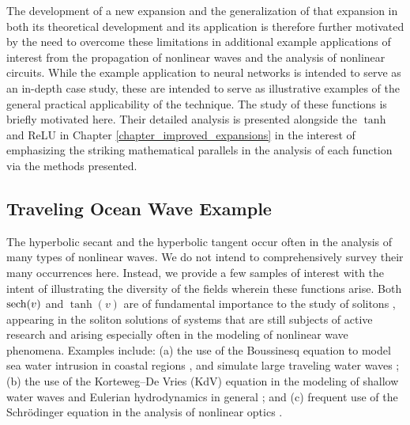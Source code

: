The development of a new expansion and the generalization of that expansion in both its theoretical development and its application is therefore further motivated by the need to overcome these limitations in additional example applications of interest from the propagation of nonlinear waves and the analysis of nonlinear circuits.  While the example application to neural networks is intended to serve as an in-depth case study, these are intended to serve as illustrative examples of the general practical applicability of the technique.  The study of these functions is briefly motivated here.  Their detailed analysis is presented alongside the $\tanh$ and ReLU in Chapter \ref{chapter_improved_expansions} in the interest of emphasizing the striking mathematical parallels in the analysis of each function via the methods presented.

\subsection{Traveling Ocean Wave Example}
The hyperbolic secant and the hyperbolic tangent occur often in the analysis of many types of nonlinear waves. We do not intend to comprehensively survey their many occurrences here.  Instead, we provide a few samples of interest with the intent of illustrating the diversity of the fields wherein these functions arise. Both $\operatorname{sech}(v)$ and $\tanh(v)$ are of fundamental importance to the study of solitons \cite{scott_soliton:_1973}, appearing in the soliton solutions of systems that are still subjects of active research and arising especially often in the modeling of nonlinear wave phenomena.  Examples include: (a) the use of the Boussinesq equation to model sea water intrusion in coastal regions \cite{jazar_derivation_2014}, and simulate large traveling water waves \cite{constantin_penalization_2015}; (b) the use of the Korteweg–De Vries (KdV) equation in the modeling of shallow water waves and Eulerian hydrodynamics in general \cite{sprenger_shock_2017}; and (c) frequent use of the Schr\"{o}dinger equation in the analysis of nonlinear optics \cite{kivshar_optical_2003}.

